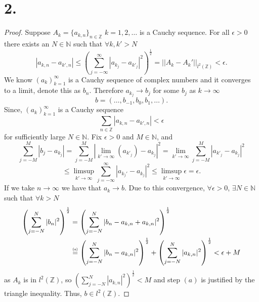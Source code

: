 \documentclass{article}
\newcommand\numeq[1]%
  {\stackrel{\scriptscriptstyle(\mkern-1.5mu#1\mkern-1.5mu)}{=}}
\begin{document}
\section*{2.}
\begin{proof}
    Suppose $A_k = \{a_{k, n} \}_{n \in \mathbb{Z}}$ $k = 1, 2, \ldots$ is a Cauchy sequence. For all $\epsilon > 0$ there exists an $N \in \mathbb{N}$ such that $\forall k, k' > N$ 
    \[
    |a_{k, n} - a_{k', n}| \leq \left(\sum\limits_{j = -\infty}^{\infty}|a_{k_j} - a_{k'_j}|^2 \right)^{\frac{1}{2}} = ||A_k - A_k'||_{l^2(\mathbb{Z})} < \epsilon.   
    \] We know $(a_k)_{k = 1}^{\infty}$ is a Cauchy sequence of complex numbers and it converges to a limit, denote this as $b_n$.  Therefore $a_{k_j} \to b_j$ for some $b_j$ as $k \to \infty$
    \[
    b = (\ldots, b_{-1}, b_0, b_{1}, \ldots).     
    \]
    Since, $(a_k)_{k = 1}^{\infty}$ is a Cauchy sequence
    \[
    \sum\limits_{n \in \mathbb{Z}}|a_{k,n} - a_{k', n} | < \epsilon    
    \]
    for sufficiently large $N \in\mathbb{N}$. 
   Fix $\epsilon > 0$ and $M \in \mathbb{N}$, and 
    \[
\sum\limits_{j = -M}^{M}|b_j - a_{k_j}| = \sum\limits_{j = -M}^M|\lim\limits_{k' \to \infty}(a_{k'_j})-a_{k_j}|^2 = \lim\limits_{k' \to \infty}\sum\limits_{j = -M}^M|a_{k'_j} - a_{k_j}|^2
\]
\[
\leq \limsup\limits_{k'\to \infty}\sum\limits_{j = -\infty}^{\infty} |a_{k_j'} - a_{k_j}|^2 \leq \limsup_{k' \to \infty} \epsilon = \epsilon.
\]
If we take $n \to \infty$ we have that $a_k \to b$. Due to this convergence, $\forall \epsilon > 0$, $\exists N \in \mathbb{N}$ such that $\forall k > N$ 
\begin{align*}
 \left(\sum\limits_{j = -N}^N|b_n|^2 \right)^{\frac{1}{2}} &= \left(\sum\limits_{j = -N}^{N}|b_n - a_{k, n} + a_{k, n}|^2 \right)^{\frac{1}{2}} \\
 &\numeq{a} \left(\sum\limits_{j = -N}^{N} |b_n - a_{k, n}|^2 \right)^{\frac{1}{2}} + \left(\sum\limits_{j = -N}^N|a_{k,n}|^2 \right)^{\frac{1}{2}} < \epsilon + M 
\end{align*}
as $A_k$ is in $l^2(\mathbb{Z})$, so $\left(\sum\limits_{j = -N}^N|a_{k,n}|^2 \right)^{\frac{1}{2}} < M$ and step $(a)$ is justified by the triangle inequality. Thus, $b \in l^2(\mathbb{Z})$. 
    
\end{proof}
\end{document}
